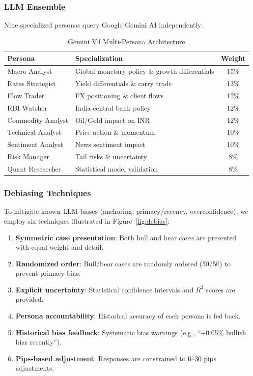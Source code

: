 \documentclass[11pt]{article}
\begin{document}
\subsubsection{LLM Ensemble}

Nine specialized personas query Google Gemini AI independently:

\begin{table}[t]
\centering
\small
\caption{Gemini V4 Multi-Persona Architecture}
\label{tab:personas}
\begin{tabular}{llc}
\toprule
\textbf{Persona} & \textbf{Specialization} & \textbf{Weight} \\
\midrule
Macro Analyst & Global monetary policy \& growth differentials & 15\% \\
Rates Strategist & Yield differentials \& carry trade & 13\% \\
Flow Trader & FX positioning \& client flows & 12\% \\
RBI Watcher & India central bank policy & 12\% \\
Commodity Analyst & Oil/Gold impact on INR & 12\% \\
Technical Analyst & Price action \& momentum & 10\% \\
Sentiment Analyst & News sentiment impact & 10\% \\
Risk Manager & Tail risks \& uncertainty & 8\% \\
Quant Researcher & Statistical model validation & 8\% \\
\bottomrule
\end{tabular}
\end{table}

\subsubsection{Debiasing Techniques}

To mitigate known LLM biases (anchoring, primacy/recency, overconfidence), we employ six techniques illustrated in Figure~\ref{fig:debias}:

\begin{enumerate}
    \item \textbf{Symmetric case presentation}: Both bull and bear cases are presented with equal weight and detail.
    \item \textbf{Randomized order}: Bull/bear cases are randomly ordered (50/50) to prevent primacy bias.
    \item \textbf{Explicit uncertainty}: Statistical confidence intervals and $R^2$ scores are provided.
    \item \textbf{Persona accountability}: Historical accuracy of each persona is fed back.
    \item \textbf{Historical bias feedback}: Systematic bias warnings (e.g., ``+0.05\% bullish bias recently'').
    \item \textbf{Pips-based adjustment}: Responses are constrained to 0--30 pips adjustments.
\end{enumerate}
\end{document}
